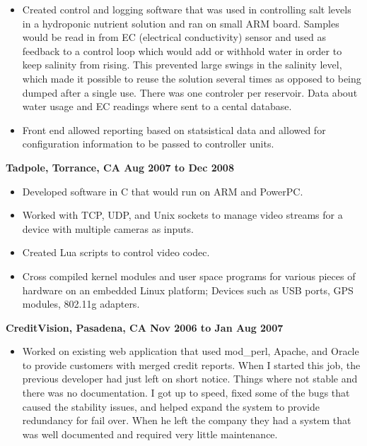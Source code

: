\documentclass{res}
\begin{document}
\begin{resume}
\begin{itemize}
\item
	Created control and logging software that was used in controlling
	salt levels in a hydroponic nutrient solution and ran on
	small ARM board.  Samples would be read in from EC (electrical
	conductivity) sensor and used as feedback to a control loop which
	would add or withhold water in order to keep salinity from rising.
	This prevented large swings in the salinity level, which made
	it possible to reuse the solution several times as opposed to
	being dumped after a single use.  There was one controler per
	reservoir.  Data about water usage and EC readings where sent
	to a cental database.

\item
	Front end allowed reporting based on statsistical data and allowed
	for configuration information to be passed to controller units.

\end{itemize}

{\large \bf Tadpole, Torrance, CA \hfill Aug 2007 to Dec 2008}

\begin{itemize}

\item
	Developed software in C that would run on ARM and PowerPC.

\item
	Worked with TCP, UDP, and Unix sockets to manage video streams
	for a device with multiple cameras as inputs.

\item
	Created Lua scripts to control video codec.

\item
	Cross compiled kernel modules and user space programs for various
	pieces of hardware on an embedded Linux platform; Devices such
	as USB ports, GPS modules, 802.11g adapters.
\end{itemize}

{\large \bf CreditVision, Pasadena, CA \hfill Nov 2006 to Jan Aug 2007}

\begin{itemize}

\item
	Worked on existing web application that used mod\_perl, Apache,
	and Oracle to provide customers with merged credit reports.
	When I started this job, the previous developer had just
	left on short notice.  Things where not stable and there was
	no documentation.  I got up to speed, fixed some of the bugs
	that caused the stability issues, and helped expand the system
	to provide redundancy for fail over.  When he left the company
	they had a system that was well documented and required very
	little maintenance.


\end{itemize}
\end{resume}
\end{document}
